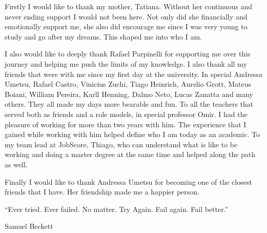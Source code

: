 \begin{agradecimentos}
Firstly I would like to thank my mother, Tatiana. Without her continuous and never ending support
I would not been here. Not only did she financially and emotionally support me, she also
did encourage me since I was very young to study and go after my dreams. This shaped me
into who I am.

I also would like to deeply thank Rafael Parpinelli for supporting me over this journey
and helping me push the limits of my knowledge. I also thank all my friends that were with
me since my first day at the university. In special Andressa Umetsu, Rafael Castro, Vinicius Zuchi,
Tiago Heinrich,
Aurelio Grott, Mateus Boiani, William Pereira, Karll Henning, Dalmo Neto, Lucas Zanatta and many others.
They all made my days more bearable and fun.
To all the teachers that served both as friends and a role models,
in special professor Omir. I had the pleasure of working for more than two years with him.
The experience that I gained while working with him helped define who I am today as an academic.
To my team lead at JobScore, Thiago, who can understand what is like to be working and doing a master
degree at the same time and helped along the path as well. 

Finally I would like to thank Andressa Umetsu for becoming one of the closest friends that
I have. Her friendship made me a happier person. 

\end{agradecimentos}

\begin{epigrafe}	
``Ever tried. Ever failed. No matter. Try Again. Fail again. Fail better.''
\\
\par
Samuel Beckett
\end{epigrafe}




